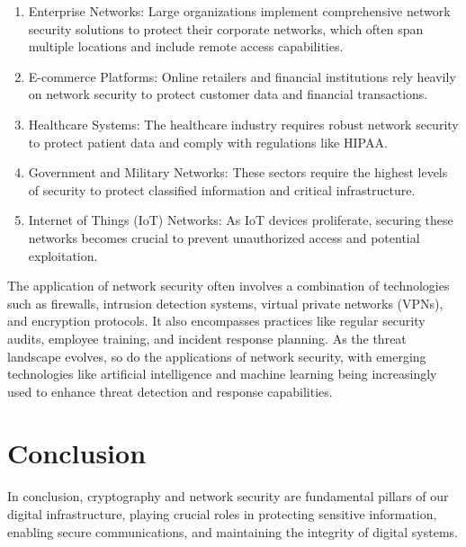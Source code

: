 \documentclass{article}
\begin{document}
\begin{enumerate}
    \item Enterprise Networks: Large organizations implement comprehensive network security solutions to protect their corporate networks, which often span multiple locations and include remote access capabilities.
    \item E-commerce Platforms: Online retailers and financial institutions rely heavily on network security to protect customer data and financial transactions.
    \item Healthcare Systems: The healthcare industry requires robust network security to protect patient data and comply with regulations like HIPAA.
    \item Government and Military Networks: These sectors require the highest levels of security to protect classified information and critical infrastructure.
    \item Internet of Things (IoT) Networks: As IoT devices proliferate, securing these networks becomes crucial to prevent unauthorized access and potential exploitation.
\end{enumerate}

The application of network security often involves a combination of technologies such as firewalls, intrusion detection systems, virtual private networks (VPNs), and encryption protocols. It also encompasses practices like regular security audits, employee training, and incident response planning. As the threat landscape evolves, so do the applications of network security, with emerging technologies like artificial intelligence and machine learning being increasingly used to enhance threat detection and response capabilities.

\section{Conclusion}

In conclusion, cryptography and network security are fundamental pillars of our digital infrastructure, playing crucial roles in protecting sensitive information, enabling secure communications, and maintaining the integrity of digital systems.
\end{document}
